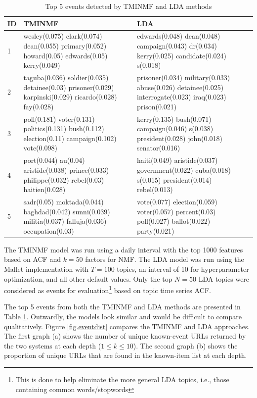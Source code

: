 \documentclass{sig-alternate}
\begin{document}
\begin{table}
\scriptsize
\begin{tabular}{| p{0.2cm} | p{3.5cm} | p{3.5cm} | } \hline
{\bf ID } & {\bf TMINMF} & {\bf LDA } \\ \hline
1 & wesley(0.075) clark(0.074) dean(0.055) primary(0.052) howard(0.05) edwards(0.05) kerry(0.049) & 
edwards(0.048) dean(0.048) campaign(0.043) dr(0.034) kerry(0.025) candidate(0.024) s(0.018)   \\ \hline
2 & taguba(0.036) soldier(0.035) detainee(0.03) prisoner(0.029) karpinski(0.029) ricardo(0.028) fay(0.028)   &
prisoner(0.034) military(0.033) abuse(0.026) detainee(0.025) interrogate(0.023) iraq(0.023) prison(0.021)  \\ \hline
3 & poll(0.181) voter(0.131) politics(0.131) bush(0.112) election(0.11) campaign(0.102) vote(0.098)  &
kerry(0.135) bush(0.071) campaign(0.046) s(0.038) president(0.028) john(0.018) senator(0.016) \\ \hline
4 & port(0.044) au(0.04) aristide(0.038) prince(0.033) philippe(0.032) rebel(0.03) haitien(0.028) &
haiti(0.049) aristide(0.037) government(0.022) cuba(0.018) s(0.015) president(0.014) rebel(0.013)  \\ \hline
5 & sadr(0.05) moktada(0.044) baghdad(0.042) sunni(0.039) militia(0.037) falluja(0.036) occupation(0.03)  &
vote(0.077) election(0.059) voter(0.057) percent(0.03) poll(0.027) ballot(0.022) party(0.021) \\ \hline
\end{tabular}
\caption{Top 5 events detected by TMINMF and LDA methods}
\label{table.top5}
\end{table}

The TMINMF model was run using a daily interval with the top 1000 features based on ACF and $k=50$ factors for NMF. The LDA model was run using the Mallet implementation with $T=100$ topics, an interval of 10 for hyperparameter optimization, and all other default values. Only the top $N=50$ LDA topics were considered as events for evaluation\footnote{This is done to help eliminate the more general LDA topics, i.e., those containing common words/stopwords} based on topic time series ACF.

The top 5 events from both the TMINMF and LDA methods are presented in Table \ref{table.top5}. Outwardly, the models look similar and would be difficult to compare qualitatively.  Figure \ref{fig.eventdist} compares the TMINMF and LDA approaches.  The first graph (a) shows the number of unique known-event URLs returned by the two systems at each depth ($1 \le k \le 10$).  The second graph (b) shows the proportion of unique URLs that are found in the known-item list  at each depth.
\end{document}
